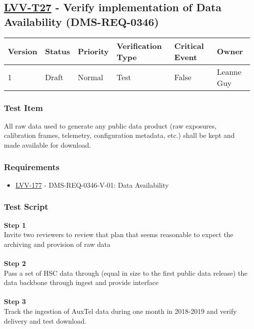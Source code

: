 \hypertarget{lvv-t27---verify-implementation-of-data-availability-dms-req-0346}{%
\subsection{\texorpdfstring{\href{https://jira.lsstcorp.org/secure/Tests.jspa\#/testCase/LVV-T27}{LVV-T27}
- Verify implementation of Data Availability
(DMS-REQ-0346)}{LVV-T27 - Verify implementation of Data Availability (DMS-REQ-0346)}}\label{lvv-t27---verify-implementation-of-data-availability-dms-req-0346}}

\begin{longtable}[]{@{}llllll@{}}
\toprule
Version & Status & Priority & Verification Type & Critical Event &
Owner\tabularnewline
\midrule
\endhead
1 & Draft & Normal & Test & False & Leanne Guy\tabularnewline
\bottomrule
\end{longtable}

\hypertarget{test-item}{%
\subsubsection{Test Item}\label{test-item}}

All raw data used to generate any public data product (raw exposures,
calibration frames, telemetry, configuration metadata, etc.) shall be
kept and made available for download.

\hypertarget{requirements-4}{%
\subsubsection{Requirements}\label{requirements-4}}

\begin{itemize}
\tightlist
\item
  \href{https://jira.lsstcorp.org/browse/LVV-177}{LVV-177} -
  DMS-REQ-0346-V-01: Data Availability
\end{itemize}

\hypertarget{test-script-4}{%
\subsubsection{Test Script}\label{test-script-4}}

\textbf{Step 1}\\
{Invite two reviewers to review that plan that seems reasonable to
expect the archiving and provision of raw data}\\
~\\
\textbf{Step 2}\\
Pass a set of HSC data through (equal in size to the first public data
release) the data backbone through ingest and provide interface\\
~\\
\textbf{Step 3}\\
Track the ingestion of AuxTel data during one month in 2018-2019 and
verify delivery and test download.\\
~\\

